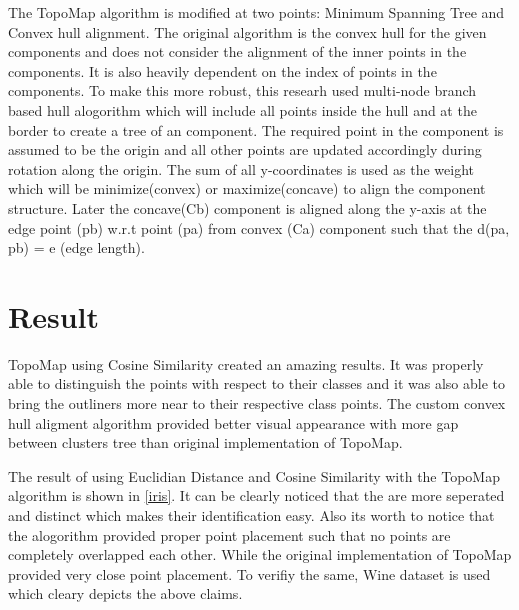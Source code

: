 \documentclass[a4paper]{article}
\begin{document}
    The TopoMap\cite{topomap} algorithm is modified at two points: Minimum Spanning Tree and Convex hull alignment. The original algorithm is the convex hull for the given components and does not consider the alignment of the inner points in the components. It is also heavily dependent on the index of points in the components. To make this more robust, this researh used multi-node branch based hull alogorithm which will include all points inside the hull and at the border to create a tree of an component. The required point in the component is assumed to be the origin and all other points are updated accordingly during rotation along the origin. The sum of all y-coordinates is used as the weight which will be minimize(convex) or maximize(concave) to align the component structure. Later the concave(Cb) component is aligned along the y-axis at the edge point (pb) w.r.t point (pa) from convex (Ca) component such that the d(pa, pb) = e (edge length).



  \section{Result}

  TopoMap\cite{topomap} using Cosine Similarity created an amazing results. It was properly able to distinguish the points with respect to their classes and it was also able to bring the outliners more near to their respective class points. The custom convex hull aligment algorithm provided better visual appearance with more gap between clusters tree than original implementation of TopoMap\cite{topomap}.

  The result of using Euclidian Distance and Cosine Similarity with the TopoMap\cite{topomap} algorithm is shown in \ref*{iris}. It can be clearly noticed that the are more seperated and distinct which makes their identification easy. Also its worth to notice that the alogorithm provided proper point placement such that no points are completely overlapped each other. While the original implementation of TopoMap provided very close point placement. To verifiy the same, Wine dataset is used which cleary depicts the above claims.
  
  \cite{topomap}
\end{document}
